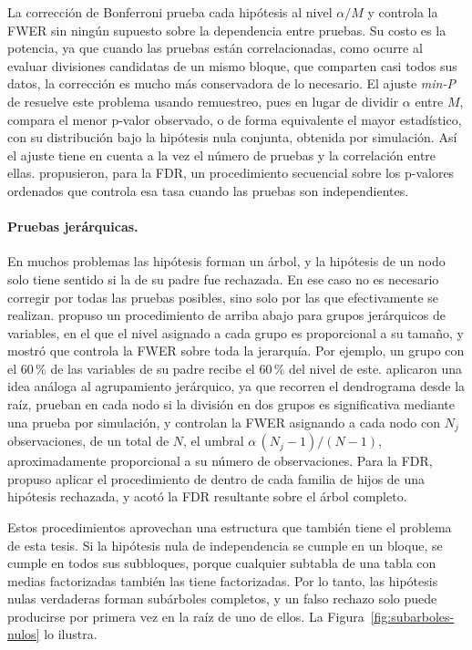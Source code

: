 La corrección de Bonferroni prueba cada hipótesis al nivel $\alpha/M$ y controla la
FWER sin ningún supuesto sobre la dependencia entre pruebas. Su costo es la
potencia, ya que cuando las pruebas están correlacionadas, como ocurre al evaluar
divisiones candidatas de un mismo bloque, que comparten casi todos sus datos, la
corrección es mucho más conservadora de lo necesario. El ajuste \emph{min-P} de
\citet{Westfall1993} resuelve este problema usando remuestreo, pues en lugar de dividir
$\alpha$ entre $M$, compara el menor p-valor observado, o de forma equivalente el
mayor estadístico, con su distribución bajo la hipótesis nula conjunta, obtenida
por simulación. Así el ajuste tiene en cuenta a la vez el número de pruebas y la
correlación entre ellas. \citet{Benjamini1995} propusieron, para la FDR, un
procedimiento secuencial sobre los p-valores ordenados que controla esa tasa
cuando las pruebas son independientes.

\paragraph{Pruebas jerárquicas.} En muchos problemas las hipótesis forman un
árbol, y la hipótesis de un nodo solo tiene sentido si la de su padre fue
rechazada. En ese caso no es necesario corregir por todas las pruebas posibles,
sino solo por las que efectivamente se realizan. \citet{Meinshausen2008} propuso un
procedimiento de arriba abajo para grupos jerárquicos de variables, en el que el
nivel asignado a cada grupo es proporcional a su tamaño, y mostró que controla la FWER sobre toda la jerarquía. Por ejemplo, un grupo con el 60\,\% de las variables de su padre recibe el 60\,\% del nivel de este. \citet{Kimes2017} aplicaron una idea análoga al
agrupamiento jerárquico, ya que recorren el dendrograma desde la raíz, prueban en cada
nodo si la división en dos grupos es significativa mediante una prueba por
simulación, y controlan la FWER asignando a cada nodo con $N_j$ observaciones,
de un total de $N$, el umbral $\alpha\,(N_j-1)/(N-1)$, aproximadamente
proporcional a su número de observaciones. Para la FDR, \citet{Yekutieli2008} propuso aplicar el
procedimiento de \citet{Benjamini1995} dentro de cada familia de hijos de una
hipótesis rechazada, y acotó la FDR resultante sobre el árbol completo.

Estos procedimientos aprovechan una estructura que también tiene el problema de
esta tesis. Si la hipótesis nula de independencia se cumple en un bloque, se
cumple en todos sus subbloques, porque cualquier subtabla de una tabla con medias
factorizadas también las tiene factorizadas. Por lo tanto, las hipótesis nulas
verdaderas forman subárboles completos, y un falso rechazo solo puede producirse
por primera vez en la raíz de uno de ellos.
 La Figura~\ref{fig:subarboles-nulos} lo ilustra.

